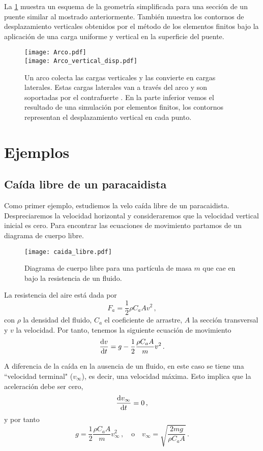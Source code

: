 La \cref{fig:puente} muestra un esquema de la geometría simplificada para una sección de un puente similar al mostrado anteriormente. También muestra los contornos de desplazamiento verticales obtenidos por el método de los elementos finitos bajo la aplicación de una carga uniforme y vertical en la superficie del puente.
\begin{figure}[H] 
\centering
\texttt{[image: Arco.pdf]}\\
\texttt{[image: Arco\_vertical\_disp.pdf]}
\caption{Un arco colecta las cargas verticales y las convierte en cargas laterales. Estas cargas laterales van a través del arco y son soportadas por el contrafuerte \cite{book:gordon-structures}. En la parte inferior vemos el resultado de una simulación por elementos finitos, los contornos representan el desplazamiento vertical en cada punto.}
\label{fig:puente}
\end{figure}


\section{Ejemplos}

\subsection{Caída libre de un paracaidista}
Como primer ejemplo, estudiemos la velo caída libre de un paracaidista. Despreciaremos la velocidad horizontal y consideraremos que la velocidad vertical inicial es cero. Para encontrar las ecuaciones de movimiento partamos de un diagrama de cuerpo libre.
\begin{figure}[h] 
\centering
\texttt{[image: caida\_libre.pdf]}
\caption{Diagrama de cuerpo libre para una partícula de masa \(m\) que cae en bajo la resistencia de un fluido.}
\label{fig:caida_libre}
\end{figure}

La resistencia del aire está dada por
\[F_a = \frac{1}{2}\rho C_a A v^2\, ,\]
con \(\rho\) la densidad del fluido, \(C_a\) el coeficiente de arrastre, \(A\) la sección transversal y \(v\) la velocidad. Por tanto, tenemos la siguiente ecuación de movimiento
\[\dv{v}{t} = g - \frac{1}{2}\frac{\rho C_a A}{m} v^2\, .\]

A diferencia de la caída en la ausencia de un fluido, en este caso se tiene una ``velocidad terminal" (\(v_\infty\)), es decir, una velocidad máxima. Esto implica que la aceleración debe ser cero,
\[\dv{v_\infty}{t} = 0\, ,\]
y por tanto
\[g = \frac{1}{2}\frac{\rho C_a A}{m} v^2_\infty\, ,\quad \text{o}\quad v_\infty = \sqrt{\frac{2 m g}{\rho C_a A}} \, .\]

